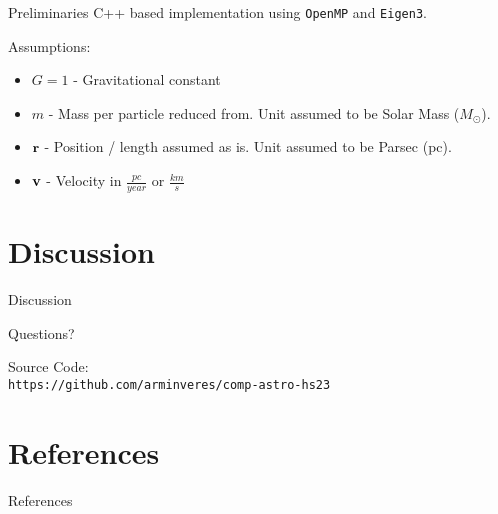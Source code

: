 \documentclass[
	9pt, %
]{beamer}
\begin{document}
\begin{frame}{Preliminaries}
	C++ based implementation using \texttt{OpenMP} and \texttt{Eigen3}.
	\bigskip

	Assumptions:
	\begin{itemize}
		\item $G = 1$ - Gravitational constant
		\item $m$ - Mass per particle reduced from. Unit assumed to be Solar Mass ($M_\odot$).
		\item $\vb{r}$ - Position / length assumed as is. Unit assumed to be Parsec (pc).
		\item $\vb{v}$ - Velocity in $\frac{pc}{year}$ or $\frac{km}{s}$
	\end{itemize}
\end{frame}






\section{Discussion}
\begin{frame}[plain] %
	\begin{center}
		{\Huge Discussion}\bigskip\bigskip

		{\LARGE Questions?}\bigskip\bigskip

		Source Code: \\
		\texttt{https://github.com/arminveres/comp-astro-hs23}
	\end{center}
\end{frame}

\section{References}
\begin{frame}[allowframebreaks]{References}
	
	
	\nocite{*}
\end{frame}
\end{document}
